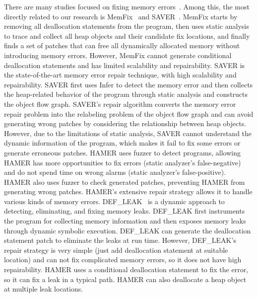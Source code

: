 \documentclass[a4paper,11pt,oneside,openany]{book}
\begin{document}
There are many studies focused on fixing memory errors~\cite{melt,leakpoint,leakfix,survey,ownership,transfor,typebase,fractional,footpatch,leakchaser,defleak,SAVER}. Among this, the most directly related to our research is MemFix~\cite{Memfix} and SAVER~\cite{SAVER}. MemFix starts by removing all deallocation statements from the program, then uses static analysis to trace and collect all heap objects and their candidate fix locations, and finally finds a set of patches that can free all dynamically allocated memory without introducing memory errors. However, MemFix cannot generate conditional deallocation statements and has limited scalability and repairability. SAVER is the state-of-the-art memory error repair technique, with high scalability and repairability. SAVER first uses Infer to detect the memory error and then collects the heap-related behavior of the program through static analysis and constructs the object flow graph. SAVER's repair algorithm converts the memory error repair problem into the relabeling problem of the object flow graph and can avoid generating wrong patches by considering the relationship between heap objects. However, due to the limitations of static analysis, SAVER cannot understand the dynamic information of the program, which makes it fail to fix some errors or generate erroneous patches. HAMER uses fuzzer to detect programs, allowing HAMER has more opportunities to fix errors (static analyzer's false-negative) and do not spend time on wrong alarms (static analyzer's false-positive). HAMER also uses fuzzer to check generated patches, preventing HAMER from generating wrong patches. HAMER's extensive repair strategy allows it to handle various kinds of memory errors. DEF\_LEAK~\cite{defleak} is a dynamic approach to detecting, eliminating, and fixing memory leaks. DEF\_LEAK first instruments the program for collecting memory information and then exposes memory leaks through dynamic symbolic execution. DEF\_LEAK can generate the deallocation statement patch to eliminate the leaks at run time. However, DEF\_LEAK's repair strategy is very simple (just add deallocation statement at suitable location) and can not fix complicated memory errors, so it does not have high repairability. HAMER uses a conditional deallocation statement to fix the error, so it can fix a leak in a typical path. HAMER can also deallocate a heap object at multiple leak locations.
\end{document}
